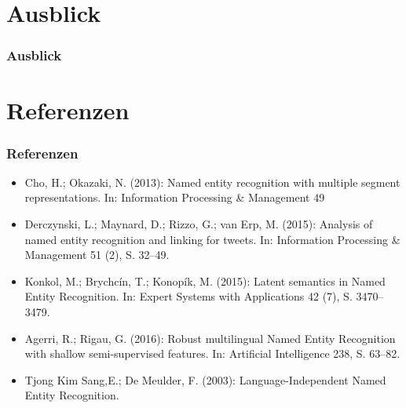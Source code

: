 \documentclass{beamer}
\begin{document}
\section{Ausblick}
	\begin{frame}
		\frametitle{Ausblick}
		
	\end{frame}
\section{Referenzen}
	\begin{frame}
		\frametitle{Referenzen}
		\begin{itemize}
			\item Cho, H.; Okazaki, N. (2013): Named entity recognition with multiple segment representations. In: Information Processing \& Management 49\\
			\item Derczynski, L.; Maynard, D.; Rizzo, G.; van Erp, M. (2015): Analysis of named entity recognition and linking for tweets. In: Information Processing \& Management 51 (2), S. 32–49.\\
			\item Konkol, M.; Brychcín, T.; Konopík, M. (2015): Latent semantics in Named Entity Recognition. In: Expert Systems with Applications 42 (7), S. 3470–3479.\\
			\item Agerri, R.; Rigau, G. (2016): Robust multilingual Named Entity Recognition with shallow semi-supervised features. In: Artificial Intelligence 238, S. 63–82.\\
			\item Tjong Kim Sang,E.; De Meulder, F. (2003): Language-Independent Named Entity Recognition.\\
		\end{itemize}
	\end{frame}
\end{document}
